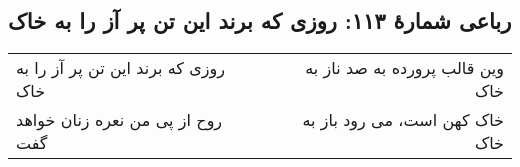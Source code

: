 \begin{center}
\section*{رباعی شمارهٔ ۱۱۳: روزی که برند این تن پر آز را به خاک}
\label{sec:113}
\begin{longtable}{l p{0.5cm} r}
روزی که برند این تن پر آز را به خاک
&&
وین قالب پرورده به صد ناز به خاک
\\
روح از پی من نعره زنان خواهد گفت
&&
خاک کهن است، می رود باز به خاک
\\
\end{longtable}
\end{center}
